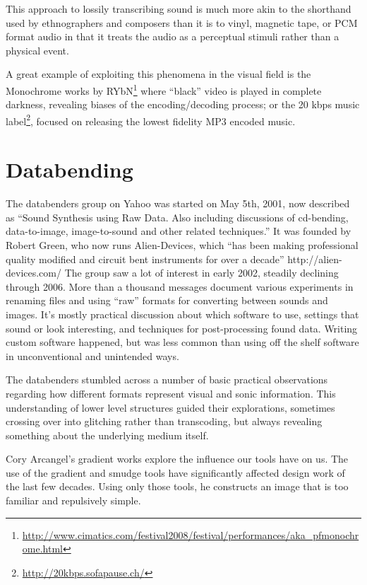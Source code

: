 \documentclass{thesis}
\begin{document}
	This approach to lossily transcribing sound is much more akin to the shorthand used by ethnographers and composers than it is to vinyl, magnetic tape, or PCM format audio in that it treats the audio as a perceptual stimuli rather than a physical event.
	
	A great example of exploiting this phenomena in the visual field is the Monochrome works by RYbN\footnote{\url{http://www.cimatics.com/festival2008/festival/performances/aka_pfmonochrome.html}} where ``black'' video is played in complete darkness, revealing biases of the encoding/decoding process; or the 20 kbps music label\footnote{\url{http://20kbps.sofapause.ch/}}, focused on releasing the lowest fidelity MP3 encoded music.
	
\section{Databending}
	\cite{indianropeburn_databenders_????}
	The databenders group on Yahoo was started on May 5th, 2001, now described as ``Sound Synthesis using Raw Data. Also including discussions of cd-bending, data-to-image, image-to-sound and other related techniques.'' It was founded by Robert Green, who now runs Alien-Devices, which ``has been making professional quality modified and circuit bent instruments for over a decade'' http://alien-devices.com/ The group saw a lot of interest in early 2002, steadily declining through 2006. More than a thousand messages document various experiments in renaming files and using ``raw'' formats for converting between sounds and images. It's mostly practical discussion about which software to use, settings that sound or look interesting, and techniques for post-processing found data. Writing custom software happened, but was less common than using off the shelf software in unconventional and unintended ways.
	
	The databenders stumbled across a number of basic practical observations regarding how different formats represent visual and sonic information. This understanding of lower level structures guided their explorations, sometimes crossing over into glitching rather than transcoding, but always revealing something about the underlying medium itself.
		
	\cite{cory_arcangel_photoshop_2009}
	Cory Arcangel's gradient works explore the influence our tools have on us. The use of the gradient and smudge tools have significantly affected design work of the last few decades. Using only those tools, he constructs an image that is too familiar and repulsively simple.
	
\end{document}
